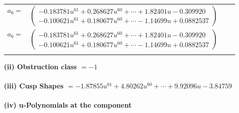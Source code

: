 \documentclass[1p]{elsarticle_modified}
\theoremstyle{definition}
\begin{document}
\begin{tabular}{m{7pt} m{180pt} m{7pt} m{180pt} }
\flushright $a_{6}=$&$\begin{pmatrix}-0.183781 u^{61}+0.268627 u^{60}+\cdots+1.82401 u-0.309920\\-0.100621 u^{61}+0.180677 u^{60}+\cdots-1.14699 u+0.0882537\end{pmatrix}$\\ \flushright $a_{6}=$&$\begin{pmatrix}-0.183781 u^{61}+0.268627 u^{60}+\cdots+1.82401 u-0.309920\\-0.100621 u^{61}+0.180677 u^{60}+\cdots-1.14699 u+0.0882537\end{pmatrix}$\\&\end{tabular}
\flushleft \textbf{(ii) Obstruction class $= -1$}\\~\\
\flushleft \textbf{(iii) Cusp Shapes $= -1.87855 u^{61}+4.80262 u^{60}+\cdots+9.92096 u-3.84759$}\\~\\
\newpage\renewcommand{\arraystretch}{1}
\flushleft \textbf{(iv) u-Polynomials at the component}\newline \\
\end{document}
